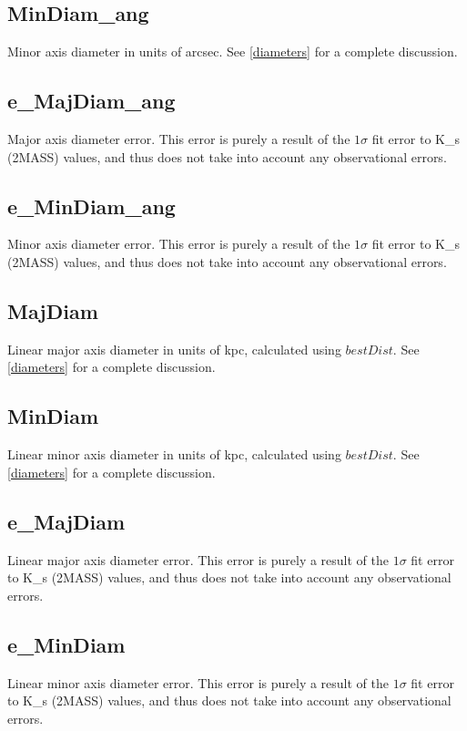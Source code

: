\documentclass[twocolumn,tighten]{aastex62}
\begin{document}
\subsection{MinDiam\_ang} \label{MinDiam_ang}
Minor axis diameter in units of arcsec. See \ref{diameters} for a complete discussion.

\subsection{e\_MajDiam\_ang} \label{e_MinDiam_ang}
Major axis diameter error. This error is purely a result of the $1\sigma$ fit error to K\_s (2MASS) values, and thus does not take into account any observational errors.

\subsection{e\_MinDiam\_ang} \label{e_MinDiam_ang}
Minor axis diameter error. This error is purely a result of the $1\sigma$ fit error to K\_s (2MASS) values, and thus does not take into account any observational errors.

\subsection{MajDiam} \label{MajDiam}
Linear major axis diameter in units of kpc, calculated using $bestDist$. See \ref{diameters} for a complete discussion.

\subsection{MinDiam} \label{MinDiam}
Linear minor axis diameter in units of kpc, calculated using $bestDist$. See \ref{diameters} for a complete discussion.

\subsection{e\_MajDiam} \label{e_MajDiam}
Linear major axis diameter error. This error is purely a result of the $1\sigma$ fit error to K\_s (2MASS) values, and thus does not take into account any observational errors.

\subsection{e\_MinDiam} \label{e_MinDiam}
Linear minor axis diameter error. This error is purely a result of the $1\sigma$ fit error to K\_s (2MASS) values, and thus does not take into account any observational errors.
\end{document}
